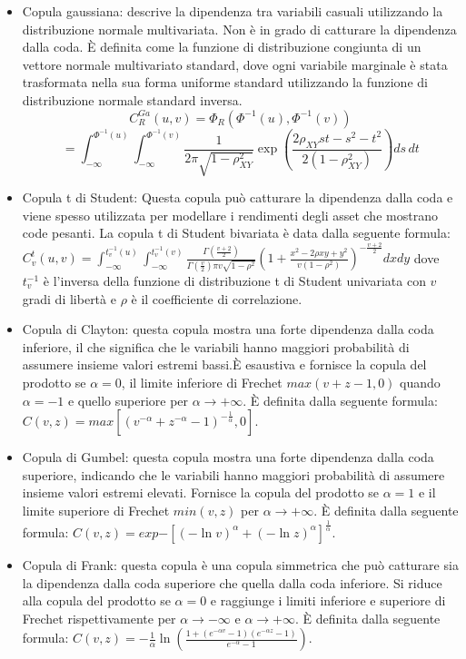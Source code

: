 \documentclass[a4paper,12pt]{article}
\begin{document}
\begin{itemize}
	\item Copula gaussiana: descrive la dipendenza tra variabili casuali utilizzando la distribuzione normale multivariata. Non è in grado di catturare la dipendenza dalla coda. È definita come la funzione di distribuzione congiunta di un vettore normale multivariato standard, dove ogni variabile marginale è stata trasformata nella sua forma uniforme standard utilizzando la funzione di distribuzione normale standard inversa.
	\[
	C_R^{Ga}(u,v)=\Phi_R (\Phi^{-1}(u), \Phi^{-1}(v)) 
	\] 
	\[
	= \int_{-\infty}^{\Phi^{-1}(u)} \int_{-\infty}^{\Phi^{-1}(v)} \frac{1}{2\pi \sqrt{1 - \rho_{XY}^2}} 
	\exp \left( \frac{2\rho_{XY}st - s^2 - t^2}{2(1 - \rho_{XY}^2)} \right) ds\, dt
	\]
	\item Copula t di Student: Questa copula può catturare la dipendenza dalla coda e viene spesso utilizzata per modellare i rendimenti degli asset che mostrano code pesanti. La copula t di Student bivariata è data dalla seguente formula:\\ $C_v^{t}(u,v)= \int_{-\infty}^{t_v^{-1}(u)} \int_{-\infty}^{t_v^{-1}(v)} \frac{\Gamma(\frac{v+2}{2})}{ \Gamma(\frac{v}{2}) \pi v \sqrt{1-\rho^2}} (1+\frac{x^2-2\rho xy + y^2}{v(1-\rho^2)})^{-\frac{v+2}{2}} dxdy$ dove $t_v^{-1}$ è l'inversa della funzione di distribuzione t di Student univariata con $v$ gradi di libertà e $\rho$ è il coefficiente di correlazione.
	\item Copula di Clayton: questa copula mostra una forte dipendenza dalla coda inferiore, il che significa che le variabili hanno maggiori probabilità di assumere insieme valori estremi bassi.È esaustiva e fornisce la copula del prodotto se $\alpha=0$, il limite inferiore di Frechet $max(v+z-1,0)$ quando $\alpha=-1$ e quello superiore per $\alpha \to +\infty$. È definita dalla seguente formula: $C(v,z)=max[(v^{-\alpha}+z^{-\alpha}-1)^{-\frac{1}{\alpha}},0]$.
	\item Copula di Gumbel: questa copula mostra una forte dipendenza dalla coda superiore, indicando che le variabili hanno maggiori probabilità di assumere insieme valori estremi elevati. Fornisce la copula del prodotto se $\alpha=1$ e il limite superiore di Frechet $min(v,z)$ per $\alpha \to +\infty$. È definita dalla seguente formula: $C(v,z)=exp{-[(-\ln v)^\alpha + (-\ln z)^\alpha]^{\frac{1}{\alpha}} }$.
	\item Copula di Frank: questa copula è una copula simmetrica che può catturare sia la dipendenza dalla coda superiore che quella dalla coda inferiore. Si riduce alla copula del prodotto se $\alpha=0$ e raggiunge i limiti inferiore e superiore di Frechet rispettivamente per $\alpha \to -\infty$ e $\alpha \to +\infty$. È definita dalla seguente formula: $C(v,z)=-\frac{1}{\alpha}\ln (\frac{1+(e^{-\alpha v}-1)(e^{-\alpha z}-1)}{e^{-\alpha}-1})$.
\end{itemize}
\end{document}

